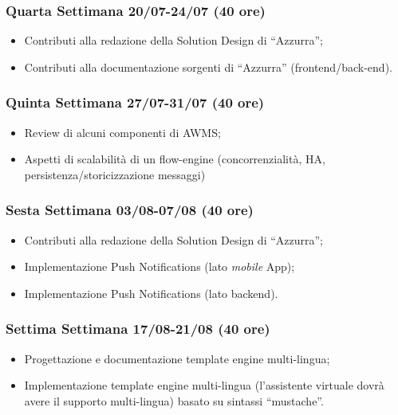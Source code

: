 \begin{trivlist}
\item \subsubsection{Quarta Settimana 20/07-24/07  (40 ore)}
\begin{itemize}
	\item Contributi alla redazione della Solution Design di “Azzurra”;
	\item Contributi alla documentazione sorgenti di “Azzurra” (frontend/\gls{back-end}\glsfirstoccur).
\end{itemize}

\item \subsubsection{Quinta Settimana 27/07-31/07 (40 ore)}
\begin{itemize}
	\item Review di alcuni componenti di \gls{AWMS};
	\item Aspetti di scalabilità di un flow-engine (concorrenzialità, HA, persistenza/storicizzazione
	messaggi)
\end{itemize}

\item \subsubsection{Sesta Settimana 03/08-07/08 (40 ore)}
\begin{itemize}
	\item Contributi alla redazione della Solution Design di “Azzurra”;
	\item Implementazione Push Notifications (lato \emph{mobile} App);
	\item Implementazione Push Notifications (lato backend).
\end{itemize}

\item \subsubsection{Settima Settimana 17/08-21/08 (40 ore)}
\begin{itemize}
	\item Progettazione e documentazione template engine multi-lingua;
	\item Implementazione template engine multi-lingua (l’assistente virtuale dovrà avere il supporto multi-lingua) basato su sintassi “mustache”.
\end{itemize}	


\end{trivlist}

